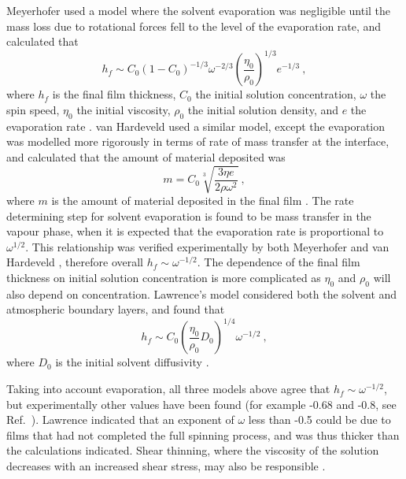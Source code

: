 Meyerhofer used a model where the solvent evaporation was negligible until the mass loss due to rotational forces fell to the level of the evaporation rate, and calculated that
\begin{equation}
h_f \sim C_0(1-C_0)^{-1/3} \omega^{-2/3} \left( \frac{\eta_0}{\rho_0} \right)^{1/3} e^{-1/3} ~,
\label{Meyehofer}
\end{equation}
where $h_f$ is the final film thickness, $C_0$ the initial solution concentration, $\omega$ the spin speed, $\eta_0$ the initial viscosity, $\rho_0$ the initial solution density, and $e$ the evaporation rate \cite{Meyerhofer1978}. van Hardeveld used a similar model, except the evaporation was modelled more rigorously in terms of rate of mass transfer at the interface, and calculated that the amount of material deposited was
\begin{equation}
m = C_0 \sqrt[3]{\frac{3 \eta e}{2 \rho {\omega}^2}} ~,
\label{Hardeveld}
\end{equation}
where $m$ is the amount of material deposited in the final film \cite{VanHardeveld1995}. The rate determining step for solvent evaporation is found to be mass transfer in the vapour phase, when it is expected that the evaporation rate is proportional to ${\omega}^{1/2}$. This relationship was verified experimentally by both Meyerhofer and van Hardeveld \cite{Meyerhofer1978, VanHardeveld1995}, therefore overall $h_f \sim \omega^{-1/2}$. The dependence of the final film thickness on initial solution concentration is more complicated as $\eta_0$ and $\rho_0$ will also depend on concentration. Lawrence's model considered both the solvent and atmospheric boundary layers, and found that
\begin{equation}
h_f \sim C_0 \left(\frac{\eta_0}{\rho_0} D_0 \right)^{1/4} \omega^{-1/2} ~,
\label{Lawrence}
\end{equation}
where $D_0$ is the initial solvent diffusivity \cite{Lawrence1988}.

Taking into account evaporation, all three models above agree that $h_f \sim \omega^{-1/2}$, but experimentally other values have been found (for example -0.68 and -0.8, see Ref.\ \cite{Lawrence1988}). Lawrence indicated that an exponent of $\omega$ less than -0.5 could be due to films that had not completed the full spinning process, and was thus thicker than the calculations indicated. Shear thinning, where the viscosity of the solution decreases with an increased shear stress, may also be responsible \cite{Lawrence1988}.

